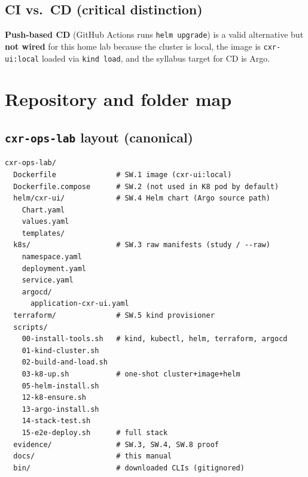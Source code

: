 \documentclass[11pt,a4paper]{report}
\begin{document}
\section{CI vs.\ CD (critical distinction)}
\begin{center}
\end{center}

\textbf{Push-based CD} (GitHub Actions runs \texttt{helm upgrade}) is a valid alternative but \textbf{not wired} for this home lab because the cluster is local, the image is \texttt{cxr-ui:local} loaded via \texttt{kind load}, and the syllabus target for CD is Argo.

\chapter{Repository and folder map}

\section{\texttt{cxr-ops-lab} layout (canonical)}
\begin{lstlisting}[style=bash,basicstyle=\ttfamily\footnotesize]
cxr-ops-lab/
  Dockerfile              # SW.1 image (cxr-ui:local)
  Dockerfile.compose      # SW.2 (not used in K8 pod by default)
  helm/cxr-ui/            # SW.4 Helm chart (Argo source path)
    Chart.yaml
    values.yaml
    templates/
  k8s/                    # SW.3 raw manifests (study / --raw)
    namespace.yaml
    deployment.yaml
    service.yaml
    argocd/
      application-cxr-ui.yaml
  terraform/              # SW.5 kind provisioner
  scripts/
    00-install-tools.sh   # kind, kubectl, helm, terraform, argocd
    01-kind-cluster.sh
    02-build-and-load.sh
    03-k8-up.sh           # one-shot cluster+image+helm
    05-helm-install.sh
    12-k8-ensure.sh
    13-argo-install.sh
    14-stack-test.sh
    15-e2e-deploy.sh      # full stack
  evidence/               # SW.3, SW.4, SW.8 proof
  docs/                   # this manual
  bin/                    # downloaded CLIs (gitignored)
\end{lstlisting}
\end{document}
